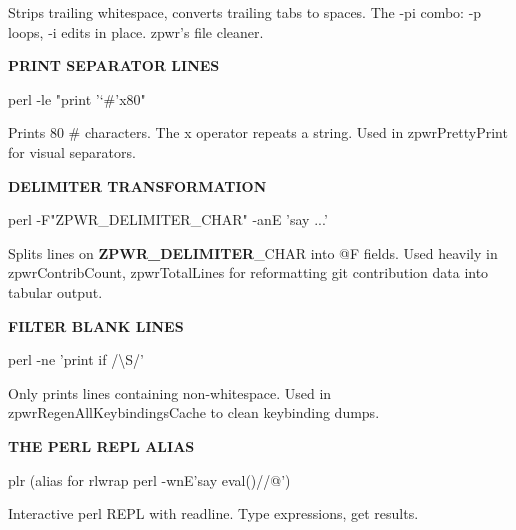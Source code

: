 \documentclass[11pt,a4paper,twoside]{book}
\begin{document}
Strips trailing whitespace, converts trailing tabs to spaces. The -pi combo: -p loops, -i edits in place. zpwr's file cleaner.


\vspace{12pt}
{\bfseries\color{neonyellow} PRINT SEPARATOR \textbf{LINES}}\vspace{4pt}

\begin{codebox}
\color{neongreen}perl -le "print '{\char`\#}'x80"\\
\end{codebox}

Prints 80 \# characters. The x operator repeats a string. Used in zpwrPrettyPrint for visual separators.


\vspace{12pt}
{\bfseries\color{neonyellow} DELIMITER TRANSFORMATION}\vspace{4pt}

\begin{codebox}
\color{neongreen}perl -F"ZPWR\_DELIMITER\_CHAR" -anE 'say ...'\\
\end{codebox}

Splits lines on \textbf{ZPWR\_DELIMITER}\_CHAR into @F fields. Used heavily in zpwrContribCount, zpwrTotalLines for reformatting git contribution data into tabular output.


\vspace{12pt}
{\bfseries\color{neonyellow} FILTER BLANK \textbf{LINES}}\vspace{4pt}

\begin{codebox}
\color{neongreen}perl -ne 'print if /\textbackslash{}S/'\\
\end{codebox}

Only prints lines containing non-whitespace. Used in zpwrRegenAllKeybindingsCache to clean keybinding dumps.


\vspace{12pt}
{\bfseries\color{neonyellow} THE PERL REPL ALIAS}\vspace{4pt}

\begin{codebox}
\color{neongreen}plr (alias for rlwrap perl -wnE'say eval()//@')\\
\end{codebox}

Interactive perl REPL with readline. Type expressions, get results.
\end{document}
